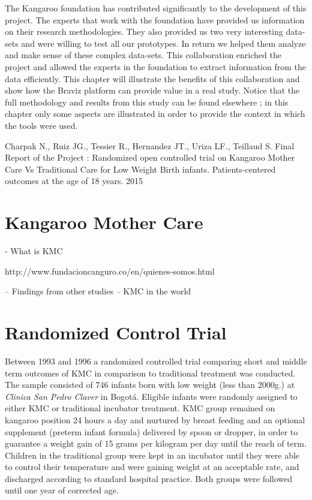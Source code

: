 \label{chap_kmc400}

The Kangaroo foundation has contributed significantly to the development of this project. The experts that work with the foundation have provided us information on their research methodologies. They also provided us two very interesting data-sets and were willing to test all our prototypes. In return we helped them analyze and make sense of these complex data-sets. This collaboration enriched the project and allowed the experts in the foundation to extract information from the data efficiently. This chapter will illustrate the benefits of this collaboration and show how the Braviz platform can provide value in a real study. Notice that the full methodology and results from this study can be found elsewhere \autocite{KMC400}; in this chapter only some aspects are illustrated in order to provide the context in which the tools were used.


Charpak N., Ruiz JG., Tessier R., Hernandez JT., Uriza LF., Teillaud S. Final Report of the Project : Randomized open controlled trial on Kangaroo Mother Care Vs Traditional Care for Low Weight Birth infants. Patients-centered outcomes at the age of 18 years. 2015

\section{Kangaroo Mother Care}


- What is KMC

http://www.fundacioncanguro.co/en/quienes-somos.html

-- Findings from other studies
-- KMC in the world

\section{Randomized Control Trial}

Between 1993 and 1996 a randomized controlled trial comparing short and middle term outcomes of KMC in comparison to traditional treatment was conducted. The sample consisted of 746 infants born with low weight (less than 2000g.) at \emph{Clinica San Pedro Claver} in Bogotá. Eligible infants were randomly assigned to either KMC or traditional incubator treatment. KMC group remained on kangaroo position 24 hours a day and nurtured by breast feeding and an optional supplement (preterm infant formula) delivered by spoon or dropper, in order to guarantee a weight gain of 15 grams per kilogram per day until the reach of term. Children in the traditional group were kept in an incubator until they were able to control their temperature and were gaining weight at an acceptable rate, and discharged according to standard hospital practice. Both groups were followed until one year of corrected age. 

